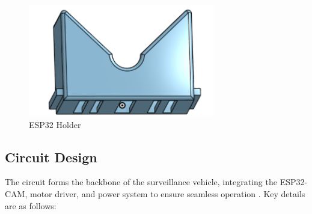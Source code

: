 \documentclass[12pt,a4paper]{report}
\begin{document}
\begin{enumerate}
\begin{figure}[H]
    \begin{minipage}{0.3\textwidth}
        \centering
        \includegraphics[width=\textwidth]{espHolder}  %
        \caption{ESP32 Holder}
        \label{fig:espHolder}
    \end{minipage}
\end{figure}    
    
    
\end{enumerate}





\label{Circuit Design}
\subsection{Circuit Design}

The circuit forms the backbone of the surveillance vehicle, integrating the ESP32-CAM, motor driver, and power system to ensure seamless operation \cite{esp32cam, circuitdesign}. Key details are as follows:
\end{document}
